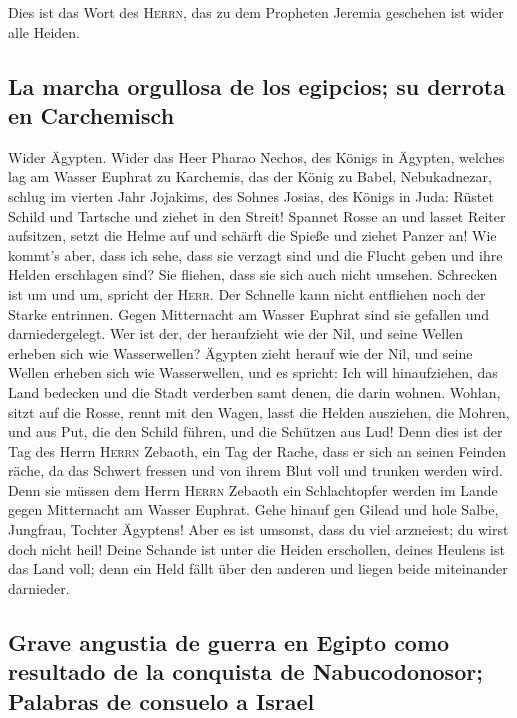  Dies ist das Wort des \textsc{Herrn}, das zu dem
Propheten Jeremia geschehen ist wider alle Heiden.

\hypertarget{la-marcha-orgullosa-de-los-egipcios-su-derrota-en-carchemisch}{%
\subsection{La marcha orgullosa de los egipcios; su derrota en
Carchemisch}\label{la-marcha-orgullosa-de-los-egipcios-su-derrota-en-carchemisch}}

 Wider Ägypten. Wider das Heer Pharao Nechos, des Königs
in Ägypten, welches lag am Wasser Euphrat zu Karchemis, das der König zu
Babel, Nebukadnezar, schlug im vierten Jahr Jojakims, des Sohnes Josias,
des Königs in Juda:  Rüstet Schild und Tartsche und ziehet
in den Streit!  Spannet Rosse an und lasset Reiter
aufsitzen, setzt die Helme auf und schärft die Spieße und ziehet Panzer
an!  Wie kommt's aber, dass ich sehe, dass sie verzagt
sind und die Flucht geben und ihre Helden erschlagen sind? Sie fliehen,
dass sie sich auch nicht umsehen. Schrecken ist um und um, spricht der
\textsc{Herr}.  Der Schnelle kann nicht entfliehen noch
der Starke entrinnen. Gegen Mitternacht am Wasser Euphrat sind sie
gefallen und darniedergelegt.  Wer ist der, der
heraufzieht wie der Nil, und seine Wellen erheben sich wie Wasserwellen?
 Ägypten zieht herauf wie der Nil, und seine Wellen
erheben sich wie Wasserwellen, und es spricht: Ich will hinaufziehen,
das Land bedecken und die Stadt verderben samt denen, die darin wohnen.
 Wohlan, sitzt auf die Rosse, rennt mit den Wagen, lasst
die Helden ausziehen, die Mohren, und aus Put, die den Schild führen,
und die Schützen aus Lud!  Denn dies ist der Tag des
Herrn \textsc{Herrn} Zebaoth, ein Tag der Rache, dass er sich an seinen
Feinden räche, da das Schwert fressen und von ihrem Blut voll und
trunken werden wird. Denn sie müssen dem Herrn \textsc{Herrn} Zebaoth
ein Schlachtopfer werden im Lande gegen Mitternacht am Wasser Euphrat.
 Gehe hinauf gen Gilead und hole Salbe, Jungfrau, Tochter
Ägyptens! Aber es ist umsonst, dass du viel arzneiest; du wirst doch
nicht heil!  Deine Schande ist unter die Heiden
erschollen, deines Heulens ist das Land voll; denn ein Held fällt über
den anderen und liegen beide miteinander darnieder.

\hypertarget{grave-angustia-de-guerra-en-egipto-como-resultado-de-la-conquista-de-nabucodonosor-palabras-de-consuelo-a-israel}{%
\subsection{Grave angustia de guerra en Egipto como resultado de la
conquista de Nabucodonosor; Palabras de consuelo a
Israel}\label{grave-angustia-de-guerra-en-egipto-como-resultado-de-la-conquista-de-nabucodonosor-palabras-de-consuelo-a-israel}}


